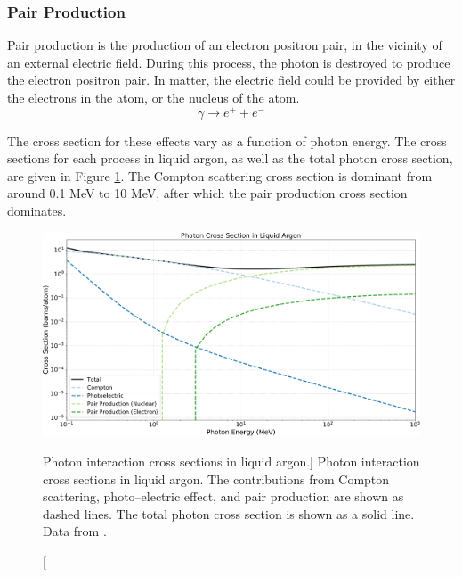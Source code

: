 \subsubsection*{Pair Production}
Pair production is the production of an electron positron pair, in the 
vicinity of an external electric field. During this process, the photon is
destroyed to produce the electron positron pair. In matter, the electric field
could be provided by either the electrons in the atom, or the nucleus of the
atom.
\begin{equation*}
	\gamma \rightarrow e^+ + e^-
\end{equation*}

\bigskip\noindent
The cross section for these effects vary as a function of photon energy. The 
cross sections for each process in liquid argon, as well as the total photon 
cross section, are given in Figure \ref{fig:photon_xsec}. The Compton scattering
cross section is dominant from around 0.1 MeV to 10 MeV, after which the pair
production cross section dominates. 

\begin{figure}

	\centering

	\includegraphics[width=\textwidth]{figures/photon_xsec.pdf}

	\caption
	[Photon interaction cross sections in liquid argon.]
	{ Photon interaction cross sections in liquid argon. The contributions from
	Compton scattering, photo--electric effect, and pair production are shown as
	dashed lines. The total photon cross section is shown as a solid line. Data 
	from \cite{photon_xsection}.}

	\label{fig:photon_xsec}

\end{figure}

